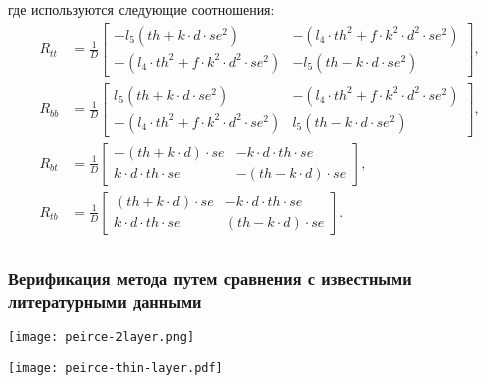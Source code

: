 \begin{frame}
    где используются следующие соотношения:
    \begin{equation*}
        \begin{split}
            R_{tt} & = \frac{1}{D} \left[\begin{array}{cc}
                - l_{5}(th + k \cdot d \cdot se^{2}) & - (l_{4}\cdot th^{2} + f\cdot k^{2} \cdot d^{2} \cdot se^{2})\\
                - (l_{4}\cdot th^{2} + f\cdot k^{2} \cdot d^{2} \cdot se^{2})  & - l_{5}(th - k \cdot d \cdot se^{2}) 
            \end{array}\right],\\
            R_{bb} & = \frac{1}{D} \left[\begin{array}{cc}
                l_{5}(th + k \cdot d \cdot se^{2}) & - (l_{4}\cdot th^{2} + f\cdot k^{2} \cdot d^{2} \cdot se^{2}) \\
                - (l_{4}\cdot th^{2} + f\cdot k^{2} \cdot d^{2} \cdot se^{2})  & l_{5}(th - k \cdot d \cdot se^{2})
            \end{array}\right],\\
            R_{bt} & = \frac{1}{D} \left[\begin{array}{cc}
                - (th + k \cdot d)\cdot se & - k \cdot d \cdot th \cdot se \\
                k \cdot d \cdot th \cdot se & - (th - k \cdot d)\cdot se 
            \end{array}\right],\\
            R_{tb} & = \frac{1}{D} \left[\begin{array}{cc}
                (th + k \cdot d)\cdot se & - k \cdot d \cdot th \cdot se \\
                k \cdot d \cdot th \cdot se & (th - k \cdot d)\cdot se  
            \end{array}\right].\\
        \end{split}
    \end{equation*}
\end{frame}


\begin{frame}
    \frametitle{Верификация метода путем сравнения с известными литературными данными}

    \begin{minipage}[t]{0.4\linewidth}
        \texttt{[image: peirce-2layer.png]}
    \end{minipage}
    \hfill
    \begin{minipage}[t]{0.57\linewidth}
        \texttt{[image: peirce-thin-layer.pdf]}
    \end{minipage}
\end{frame}

